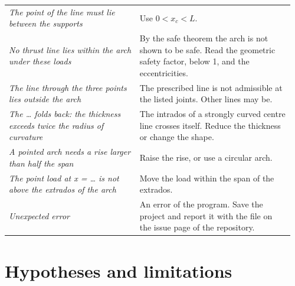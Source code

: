 \documentclass[fontsize=10.5pt,paper=a4,parskip=half,headings=normal,numbers=noenddot,
  open=any,bibliography=totoc,captions=tableheading]{scrreprt}
\numberwithin{figure}{chapter}
\numberwithin{table}{chapter}
\begin{document}
{\begin{longtable}{@{}>{\raggedright\arraybackslash}p{0.44\linewidth}>{\raggedright\arraybackslash}p{0.52\linewidth}@{}}
\emph{The point of the line must lie between the supports} & Use $0<x_c<L$.\\
\emph{No thrust line lies within the arch under these loads} & By the safe theorem the arch is not
shown to be safe. Read the geometric safety factor, below 1, and the eccentricities.\\
\emph{The line through the three points lies outside the arch} & The prescribed line is not admissible
at the listed joints. Other lines may be.\\
\emph{The … folds back: the thickness exceeds twice the radius of curvature} & The intrados of a
strongly curved centre line crosses itself. Reduce the thickness or change the shape.\\
\emph{A pointed arch needs a rise larger than half the span} & Raise the rise, or use a circular
arch.\\
\emph{The point load at x = … is not above the extrados of the arch} & Move the load within the span of
the extrados.\\
\emph{Unexpected error} & An error of the program. Save the project and report it with the file on the
issue page of the repository.\\
\end{longtable}}

\chapter{Hypotheses and limitations}\label{ch:limits}
\end{document}
